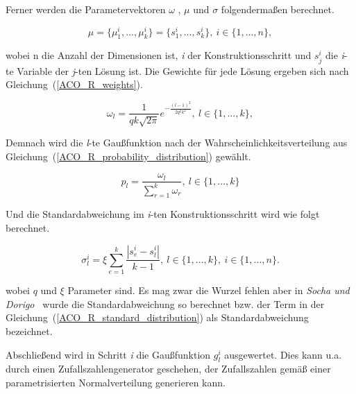 \documentclass[fontsize=12, a4aper]{scrartcl}
\begin{document}
	\noindent Ferner werden die Parametervektoren \(\omega\) , \(\mu\) und \(\sigma\) folgendermaßen berechnet.
	
	\begin{equation}
	\mu = \{ \mu^i_1, ...,\mu^i_k \} = \{ s^i_1, ..., s^i_k \}, ~  i \in \{1, ..., n\},
	\end{equation}
	
	\noindent wobei n die Anzahl der Dimensionen ist, \textit{i} der Konstruktionsschritt und \(s^i_j\) die \textit{i}-te Variable der \textit{j}-ten Lösung ist. Die Gewichte für jede Lösung ergeben sich nach Gleichung~(\ref{ACO_R_weights}).\hfill\newline
	
	\begin{equation} \label{ACO_R_weights}
	\omega_l = \frac{1}{qk\sqrt{2\pi}}e^{-\frac{(l-1)^2}{2q^2k^2}}, ~ 
	l \in \{1, ..., k\},
	\end{equation}
	
	\noindent Demnach wird die \textit{l}-te Gaußfunktion nach der Wahrscheinlichkeitsverteilung aus Gleichung~(\ref{ACO_R_probability_distribution}) gewählt.
	
	\begin{equation} \label{ACO_R_probability_distribution}
	p_l = \frac{\omega_l}{\sum_{r=1}^{k} \omega_r},  ~ 
	l \in \{1, ..., k\}
	\end{equation}
	
	\noindent Und die Standardabweichung im \textit{i}-ten Konstruktionsschritt wird wie folgt berechnet.
	
	\begin{equation} \label{ACO_R_standard_distribution}
	\sigma^i_l=\xi \sum_{e=1}^{k} \frac{|s^i_e-s^i_l|}{k-1}, ~ l \in \{1, ..., k\}, ~ i \in \{1, ..., n\}.
	\end{equation}
	
	\noindent wobei \(q\) und \(\xi\) Parameter sind. Es mag zwar die Wurzel fehlen aber in \textit{Socha und Dorigo}~\cite{socha2008ant} wurde die Standardabweichung so berechnet bzw. der Term in der Gleichung~(\ref{ACO_R_standard_distribution}) als Standardabweichung bezeichnet.\hfill\newline
	
	\noindent Abschließend wird in Schritt \textit{i} die Gaußfunktion \(g^i_l\) ausgewertet. Dies kann u.a. durch einen Zufallszahlengenerator geschehen, der Zufallszahlen gemäß einer parametrisierten Normalverteilung generieren kann. \hfill\newline
	
\end{document}
